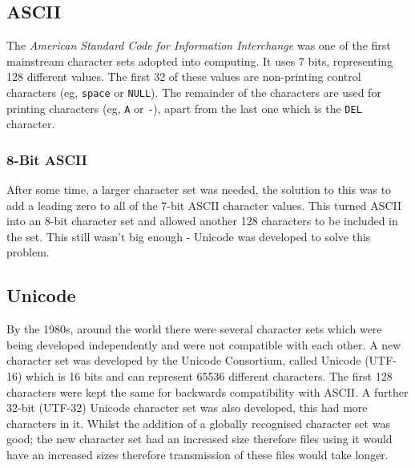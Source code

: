 \documentclass[a4paper,11pt, twocolumn]{article}
\begin{document}
\subsection{ASCII}
The \textit{American Standard Code for Information Interchange} was one of the first mainstream character sets adopted into computing. It uses 7 bits, representing 128 different values. The first 32 of these values are non-printing control characters (eg, \verb|space| or \verb|NULL|). The remainder of the characters are used for printing characters (eg, \verb|A| or \verb|-|), apart from the last one which is the \verb|DEL| character.
\subsubsection{8-Bit ASCII}
After some time, a larger character set was needed, the solution to this was to add a leading zero to all of the 7-bit ASCII character values. This turned ASCII into an 8-bit character set and allowed another 128 characters to be included in the set. This still wasn't big enough - Unicode was developed to solve this problem.
\subsection{Unicode}
By the 1980s, around the world there were several character sets which were being developed independently and were not compatible with each other. A new character set was developed by the Unicode Consortium, called Unicode (UTF-16) which is 16 bits and can represent 65536 different characters. The first 128 characters were kept the same for backwards compatibility with ASCII. A further 32-bit (UTF-32) Unicode character set was also developed, this had more characters in it. Whilst the addition of a globally recognised character set was good; the new character set had an increased size therefore files using it would have an increased sizes therefore transmission of these files would take longer. 
\end{document}
